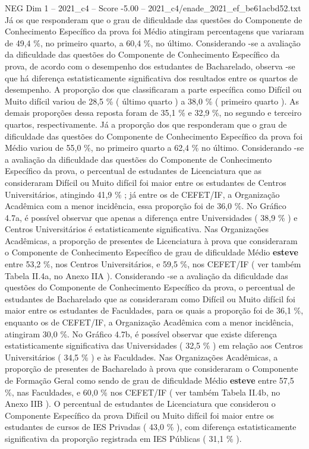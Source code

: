 \begin{textsample}{NEG Dim 1 – 2021\_c4 – Score -5.00 – 2021\_c4/enade\_2021\_ef\_be61acbd52.txt}
Já os que responderam que o grau de dificuldade das questões do Componente de Conhecimento Específico da prova foi Médio atingiram percentagens que variaram de 49,4 \%, no primeiro quarto, a 60,4 \%, no último.
Considerando -se a avaliação da dificuldade das questões do Componente de Conhecimento Específico da prova, de acordo com o desempenho dos estudantes de Bacharelado, observa -se que há diferença estatisticamente significativa dos resultados entre os quartos de desempenho.
A proporção dos que classificaram a parte específica como Difícil ou Muito difícil variou de 28,5 \% ( último quarto ) a 38,0 \% ( primeiro quarto ).
As demais proporções dessa reposta foram de 35,1 \% e 32,9 \%, no segundo e terceiro quartos, respectivamente.
Já a proporção dos que responderam que o grau de dificuldade das questões do Componente de Conhecimento Específico da prova foi Médio variou de 55,0 \%, no primeiro quarto a 62,4 \% no último.
Considerando -se a avaliação da dificuldade das questões do Componente de Conhecimento Específico da prova, o percentual de estudantes de Licenciatura que as consideraram Difícil ou Muito difícil foi maior entre os estudantes de Centros Universitários, atingindo 41,9 \% ; já entre os de CEFET/IF, a Organização Acadêmica com a menor incidência, essa proporção foi de 36,0 \%.
No Gráfico 4.7a, é possível observar que apenas a diferença entre Universidades ( 38,9 \% ) e Centros Universitários é estatisticamente significativa.
Nas Organizações Acadêmicas, a proporção de presentes de Licenciatura à prova que consideraram o Componente de Conhecimento Específico de grau de dificuldade Médio \textbf{esteve} entre 53,2 \%, nos Centros Universitários, e 59,5 \%, nos CEFET/IF ( ver também Tabela II.4a, no Anexo IIA ).
Considerando -se a avaliação da dificuldade das questões do Componente de Conhecimento Específico da prova, o percentual de estudantes de Bacharelado que as consideraram como Difícil ou Muito difícil foi maior entre os estudantes de Faculdades, para os quais a proporção foi de 36,1 \%, enquanto os de CEFET/IF, a Organização Acadêmica com a menor incidência, atingiram 30,0 \%.
No Gráfico 4.7b, é possível observar que existe diferença estatisticamente significativa das Universidades ( 32,5 \% ) em relação aos Centros Universitários ( 34,5 \% ) e às Faculdades.
Nas Organizações Acadêmicas, a proporção de presentes de Bacharelado à prova que consideraram o Componente de Formação Geral como sendo de grau de dificuldade Médio \textbf{esteve} entre 57,5 \%, nas Faculdades, e 60,0 \% nos CEFET/IF ( ver também Tabela II.4b, no Anexo IIB ).
O percentual de estudantes de Licenciatura que considerou o Componente Específico da prova Difícil ou Muito difícil foi maior entre os estudantes de cursos de IES Privadas ( 43,0 \% ), com diferença estatisticamente significativa da proporção registrada em IES Públicas ( 31,1 \% ).

\end{textsample}

